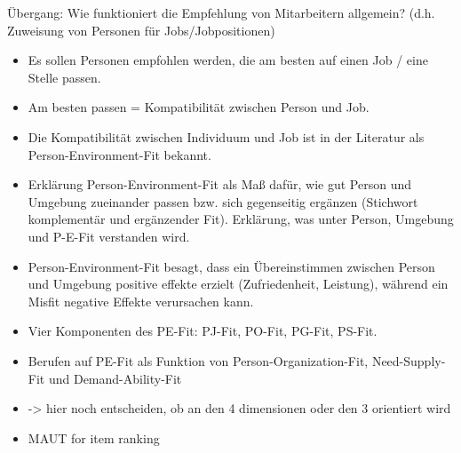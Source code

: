 Übergang: Wie funktioniert die Empfehlung von Mitarbeitern allgemein? (d.h. Zuweisung von Personen für Jobs/Jobpositionen)
\begin{itemize}
    \item Es sollen Personen empfohlen werden, die am besten auf einen Job / eine Stelle passen.
    \item Am besten passen = Kompatibilität zwischen Person und Job. %
    \item Die Kompatibilität zwischen Individuum und Job ist in der Literatur als Person-Environment-Fit bekannt. %
    \item Erklärung Person-Environment-Fit als Maß dafür, wie gut Person und Umgebung zueinander passen bzw. sich gegenseitig ergänzen (Stichwort komplementär und ergänzender Fit). Erklärung, was unter Person, Umgebung und P-E-Fit verstanden wird.
    \item Person-Environment-Fit besagt, dass ein Übereinstimmen zwischen Person und Umgebung positive effekte erzielt (Zufriedenheit, Leistung), während ein Misfit negative Effekte verursachen kann. %
    \item Vier Komponenten des PE-Fit: PJ-Fit, PO-Fit, PG-Fit, PS-Fit. %
    \item Berufen auf PE-Fit als Funktion von Person-Organization-Fit, Need-Supply-Fit und Demand-Ability-Fit %
    \item -> hier noch entscheiden, ob an den 4 dimensionen oder den 3 orientiert wird
    \item MAUT for item ranking %
\end{itemize}

